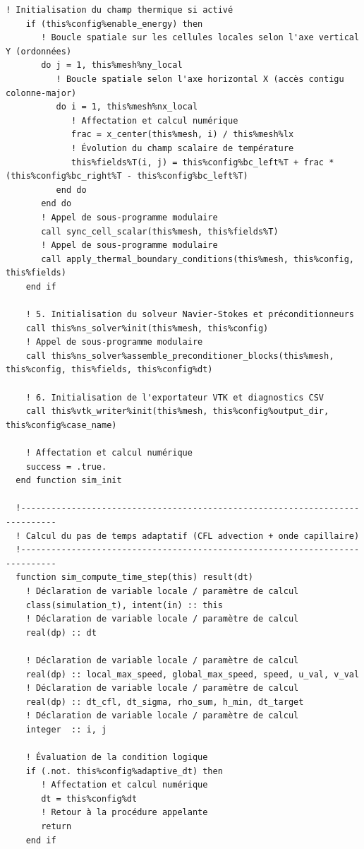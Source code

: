 \documentclass[10pt,a4paper,oneside]{book}
\begin{document}
\begin{lstlisting}[language={[95]Fortran}]
    ! Initialisation du champ thermique si activé
    if (this%config%enable_energy) then
       ! Boucle spatiale sur les cellules locales selon l'axe vertical Y (ordonnées)
       do j = 1, this%mesh%ny_local
          ! Boucle spatiale selon l'axe horizontal X (accès contigu colonne-major)
          do i = 1, this%mesh%nx_local
             ! Affectation et calcul numérique
             frac = x_center(this%mesh, i) / this%mesh%lx
             ! Évolution du champ scalaire de température
             this%fields%T(i, j) = this%config%bc_left%T + frac * (this%config%bc_right%T - this%config%bc_left%T)
          end do
       end do
       ! Appel de sous-programme modulaire
       call sync_cell_scalar(this%mesh, this%fields%T)
       ! Appel de sous-programme modulaire
       call apply_thermal_boundary_conditions(this%mesh, this%config, this%fields)
    end if

    ! 5. Initialisation du solveur Navier-Stokes et préconditionneurs
    call this%ns_solver%init(this%mesh, this%config)
    ! Appel de sous-programme modulaire
    call this%ns_solver%assemble_preconditioner_blocks(this%mesh, this%config, this%fields, this%config%dt)

    ! 6. Initialisation de l'exportateur VTK et diagnostics CSV
    call this%vtk_writer%init(this%mesh, this%config%output_dir, this%config%case_name)

    ! Affectation et calcul numérique
    success = .true.
  end function sim_init

  !-----------------------------------------------------------------------------
  ! Calcul du pas de temps adaptatif (CFL advection + onde capillaire)
  !-----------------------------------------------------------------------------
  function sim_compute_time_step(this) result(dt)
    ! Déclaration de variable locale / paramètre de calcul
    class(simulation_t), intent(in) :: this
    ! Déclaration de variable locale / paramètre de calcul
    real(dp) :: dt

    ! Déclaration de variable locale / paramètre de calcul
    real(dp) :: local_max_speed, global_max_speed, speed, u_val, v_val
    ! Déclaration de variable locale / paramètre de calcul
    real(dp) :: dt_cfl, dt_sigma, rho_sum, h_min, dt_target
    ! Déclaration de variable locale / paramètre de calcul
    integer  :: i, j

    ! Évaluation de la condition logique
    if (.not. this%config%adaptive_dt) then
       ! Affectation et calcul numérique
       dt = this%config%dt
       ! Retour à la procédure appelante
       return
    end if


\end{lstlisting}
\end{document}
